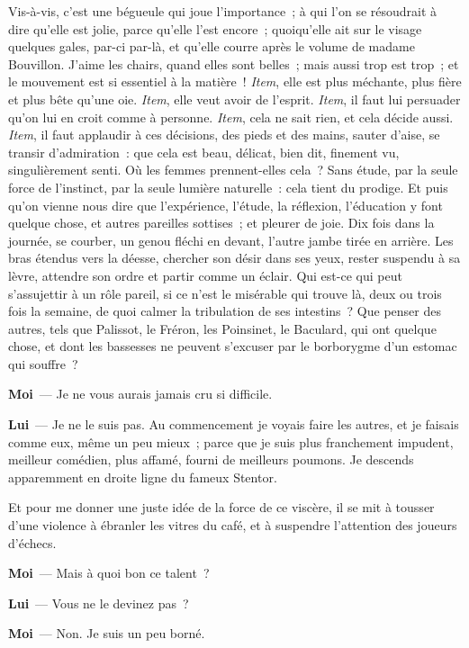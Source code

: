 \documentclass[french,twoside]{book} %
\newcommand{\labelchar}[1]{\textbf{\color{rubric} #1}}
\begin{document}
Vis-à-vis, c’est une bégueule qui joue l’importance ; à qui l’on se résoudrait à dire qu’elle est jolie, parce qu’elle l’est encore ; quoiqu’elle ait sur le visage quelques gales, par-ci par-là, et qu’elle courre après le volume de madame Bouvillon. J’aime les chairs, quand elles sont belles ; mais aussi trop est trop ; et le mouvement est si essentiel à la matière ! \emph{Item}, elle est plus méchante, plus fière et plus bête qu’une oie. \emph{Item}, elle veut avoir de l’esprit. \emph{Item}, il faut lui persuader qu’on lui en croit comme à personne. \emph{Item}, cela ne sait rien, et cela décide aussi. \emph{Item}, il faut applaudir à ces décisions, des pieds et des mains, sauter d’aise, se transir d’admiration : que cela est beau, délicat, bien dit, finement vu, singulièrement senti. Où les femmes prennent-elles cela ? Sans étude, par la seule force de l’instinct, par la seule lumière naturelle : cela tient du prodige. Et puis qu’on vienne nous dire que l’expérience, l’étude, la réflexion, l’éducation y font quelque chose, et autres pareilles sottises ; et pleurer de joie. Dix fois dans la journée, se courber, un genou fléchi en devant, l’autre jambe tirée en arrière. Les bras étendus vers la déesse, chercher son désir dans ses yeux, rester suspendu à sa lèvre, attendre son ordre et partir comme un éclair. Qui est-ce qui peut s’assujettir à un rôle pareil, si ce n’est le misérable qui trouve là, deux ou trois fois la semaine, de quoi calmer la tribulation de ses intestins ? Que penser des autres, tels que Palissot, le Fréron, les Poinsinet, le Baculard, qui ont quelque chose, et dont les bassesses ne peuvent s’excuser par le borborygme d’un estomac qui souffre ?\par
\labelchar{Moi} — Je ne vous aurais jamais cru si difficile.\par
\labelchar{Lui} — Je ne le suis pas. Au commencement je voyais faire les autres, et je faisais comme eux, même un peu mieux ; parce que je suis plus franchement impudent, meilleur comédien, plus affamé, fourni de meilleurs poumons. Je descends apparemment en droite ligne du fameux Stentor.\par
Et pour me donner une juste idée de la force de ce viscère, il se mit à tousser d’une violence à ébranler les vitres du café, et à suspendre l’attention des joueurs d’échecs.\par
\labelchar{Moi} — Mais à quoi bon ce talent ?\par
\labelchar{Lui} — Vous ne le devinez pas ?\par
\labelchar{Moi} — Non. Je suis un peu borné.\par
\end{document}
